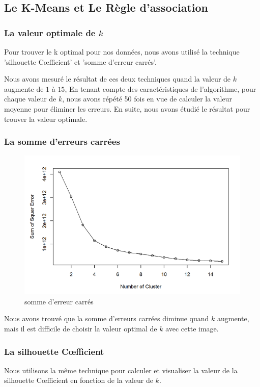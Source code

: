 \subsection{Le K-Means et Le Règle d'association }
\subsubsection{La valeur optimale de $k$}
Pour trouver le k optimal pour nos données, nous avons utilisé la technique 'silhouette C\oe fficient' et 'somme d'erreur carrés'.

Nous avons mesuré le résultat de ces deux techniques quand la valeur de $k$ augmente de $1$ à $15$, En tenant compte des caractéristiques de l'algorithme, pour chaque valeur de $k$, nous avons répété 50 fois en vue de calculer la valeur moyenne pour éliminer les erreurs. En suite, nous avons étudié le résultat pour trouver la valeur optimale.
\subsubsection*{La somme d'erreurs carrées}
\begin{figure}[H]
\centering
\includegraphics[width=0.8\linewidth]{images/sse}
\caption{somme d'erreur carrés}
\label{fig:sse}
\end{figure}
Nous avons trouvé que la somme d'erreurs carrées diminue quand $k$ augmente, mais il est difficile de choisir la valeur optimal de $k$ avec cette image.

\subsubsection*{La silhouette C\oe fficient}
Nous utilisons la même technique pour calculer et visualiser la valeur de la silhouette C\oe fficient en fonction de la valeur de $k$.

